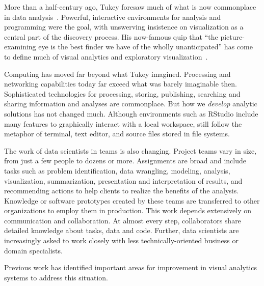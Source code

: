 
\maketitle

More than a half-century ago, Tukey foresaw
much of what is now commonplace in data analysis~\cite{TukeyFDA}.
Powerful, interactive environments for analysis and programming were
the goal, with unswerving insistence on visualization as a
central part of the discovery process. His now-famous quip that
``the picture-examining eye is the best finder we have of the
wholly unanticipated'' has come to define much of visual analytics
and exploratory visualization~\cite{TukeyEDA}.

Computing has moved far beyond what Tukey imagined.
Processing and networking capabilities today far exceed
what was barely imaginable then. Sophisticated technologies
for processing, storing, publishing, searching and sharing
information and analyses are commonplace.
But how we \emph{develop} analytic solutions has not changed much. 
Although environments such as RStudio include many features to
graphically interact with a local workspace, still follow the metaphor
of terminal, text editor, and source files stored in file systems.

The work of data scientists in teams is also changing.
Project teams vary in size, from just a few people to dozens or
more.
Assignments are broad and include tasks such as problem identification,
data wrangling, modeling, analysis, visualization, summarization,
presentation and interpretation of results, and recommending
actions to help clients to realize the benefits of the analysis.
Knowledge or software prototypes created by these teams are transferred
to other organizations to employ them in production.
This work depends extensively on communication and collaboration.
At almost every step, collaborators share detailed knowledge about tasks,
data and code.
Further, data scientists are increasingly asked to work closely
with less technically-oriented business or domain specialists.

Previous work has identified important areas for improvement in
visual analytics systems to address this situation.

